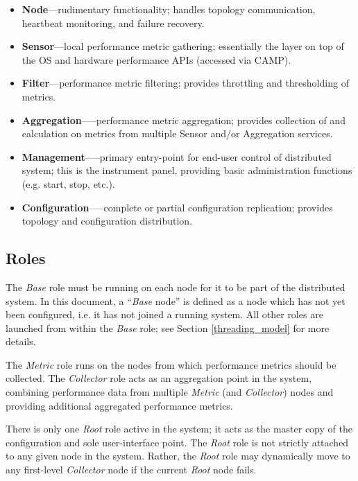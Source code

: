 \begin{itemize}

\item \textbf{Node}---rudimentary \dcamp functionality; handles topology communication, heartbeat monitoring, and failure
      recovery.
\item \textbf{Sensor}---local performance metric gathering; essentially the \dcamp layer on top of the OS and hardware
      performance APIs (accessed via CAMP).
\item \textbf{Filter}---performance metric filtering; provides throttling and thresholding of metrics.
\item \textbf{Aggregation}--—performance metric aggregation; provides collection of and calculation on metrics from
      multiple Sensor and/or Aggregation services.
\item \textbf{Management}--—primary entry-point for end-user control of \dcamp distributed system; this is the \dcamp
      instrument panel, providing basic administration functions (e.g. start, stop, etc.).
\item \textbf{Configuration}--—complete or partial configuration replication; provides topology and configuration
      distribution.

\end{itemize}

\subsection{Roles}

The \textit{Base} role must be running on each node for it to be part of the \dcamp distributed system. In this
document, a ``\textit{Base} node'' is defined as a \dcamp node which has not yet been configured, i.e. it has not joined
a running \dcamp system. All other roles are launched from within the \textit{Base} role; see Section
\ref{threading_model} for more details.

The \textit{Metric} role runs on the nodes from which performance metrics should be collected. The \textit{Collector}
role acts as an aggregation point in the system, combining performance data from multiple \textit{Metric} (and
\textit{Collector}) nodes and providing additional aggregated performance metrics.

There is only one \textit{Root} role active in the system; it acts as the master copy of the \dcamp configuration and
sole user-interface point. The \textit{Root} role is not strictly attached to any given node in the system. Rather, the
\textit{Root} role may dynamically move to any first-level \textit{Collector} node if the current \textit{Root} node
fails.

